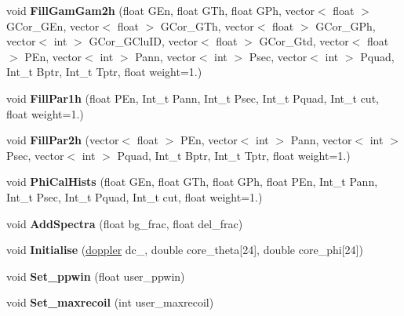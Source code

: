 \begin{DoxyCompactItemize}
\item 
\mbox{\label{classhists_a77c5d523f6064a42098c029ffaa0fbbc}} 
void {\bfseries Fill\+Gam\+Gam2h} (float G\+En, float G\+Th, float G\+Ph, vector$<$ float $>$ G\+Cor\+\_\+\+G\+En, vector$<$ float $>$ G\+Cor\+\_\+\+G\+Th, vector$<$ float $>$ G\+Cor\+\_\+\+G\+Ph, vector$<$ int $>$ G\+Cor\+\_\+\+G\+Clu\+ID, vector$<$ float $>$ G\+Cor\+\_\+\+Gtd, vector$<$ float $>$ P\+En, vector$<$ int $>$ Pann, vector$<$ int $>$ Psec, vector$<$ int $>$ Pquad, Int\+\_\+t Bptr, Int\+\_\+t Tptr, float weight=1.)
\item 
\mbox{\label{classhists_a618651882b77d410480e624dfd4b8ee4}} 
void {\bfseries Fill\+Par1h} (float P\+En, Int\+\_\+t Pann, Int\+\_\+t Psec, Int\+\_\+t Pquad, Int\+\_\+t cut, float weight=1.)
\item 
\mbox{\label{classhists_abdb2e69023e9fdd9080bcef611c26125}} 
void {\bfseries Fill\+Par2h} (vector$<$ float $>$ P\+En, vector$<$ int $>$ Pann, vector$<$ int $>$ Psec, vector$<$ int $>$ Pquad, Int\+\_\+t Bptr, Int\+\_\+t Tptr, float weight=1.)
\item 
\mbox{\label{classhists_ab48ef7120a82723ec1db8fde8143d532}} 
void {\bfseries Phi\+Cal\+Hists} (float G\+En, float G\+Th, float G\+Ph, float P\+En, Int\+\_\+t Pann, Int\+\_\+t Psec, Int\+\_\+t Pquad, Int\+\_\+t cut, float weight=1.)
\item 
\mbox{\label{classhists_a2c942db6bbc7c28eec21426d84be5692}} 
void {\bfseries Add\+Spectra} (float bg\+\_\+frac, float del\+\_\+frac)
\item 
\mbox{\label{classhists_ac62392683100b682f0225a792d9cb645}} 
void {\bfseries Initialise} (\hyperlink{classdoppler}{doppler} dc\+\_\+, double core\+\_\+theta\mbox{[}24\mbox{]}, double core\+\_\+phi\mbox{[}24\mbox{]})
\item 
\mbox{\label{classhists_a98cf7d91940c6d77105d07b0783399ee}} 
void {\bfseries Set\+\_\+ppwin} (float user\+\_\+ppwin)
\item 
\mbox{\label{classhists_ae986e831e139c9e7e5a4e327e864484d}} 
void {\bfseries Set\+\_\+maxrecoil} (int user\+\_\+maxrecoil)
\item 

\end{DoxyCompactItemize}
